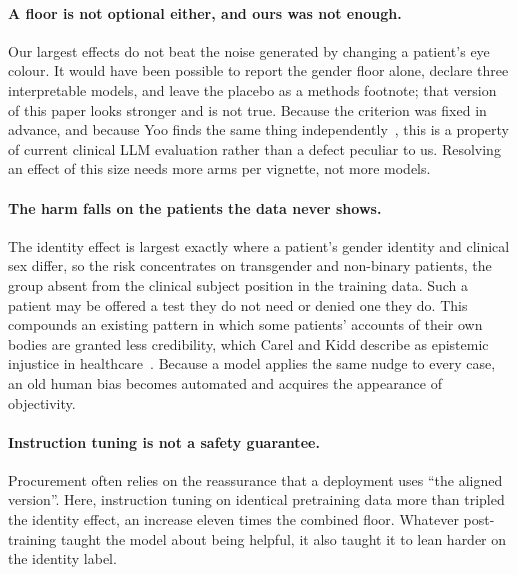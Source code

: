 \documentclass[11pt,twocolumn]{article}
\begin{document}
\paragraph{A floor is not optional either, and ours was not enough.} Our
largest effects do not beat the noise generated by changing a patient's eye
colour. It would have been possible to report the gender floor alone, declare
three interpretable models, and leave the placebo as a methods footnote; that
version of this paper looks stronger and is not true. Because the criterion was
fixed in advance, and because Yoo finds the same thing
independently~\cite{r22}, this is a property of current clinical LLM evaluation
rather than a defect peculiar to us. Resolving an effect of this size needs more
arms per vignette, not more models.

\paragraph{The harm falls on the patients the data never shows.} The identity
effect is largest exactly where a patient's gender identity and clinical sex
differ, so the risk concentrates on transgender and non-binary patients, the
group absent from the clinical subject position in the training data. Such a
patient may be offered a test they do not need or denied one they do. This
compounds an existing pattern in which some patients' accounts of their own
bodies are granted less credibility, which Carel and Kidd describe as epistemic
injustice in healthcare~\cite{r28}. Because a model applies the same nudge to
every case, an old human bias becomes automated and acquires the appearance of
objectivity.

\paragraph{Instruction tuning is not a safety guarantee.} Procurement often
relies on the reassurance that a deployment uses ``the aligned version''. Here,
instruction tuning on identical pretraining data more than tripled the identity
effect, an increase eleven times the combined floor. Whatever
post-training taught the model about being helpful, it also taught it to lean
harder on the identity label.
\end{document}
